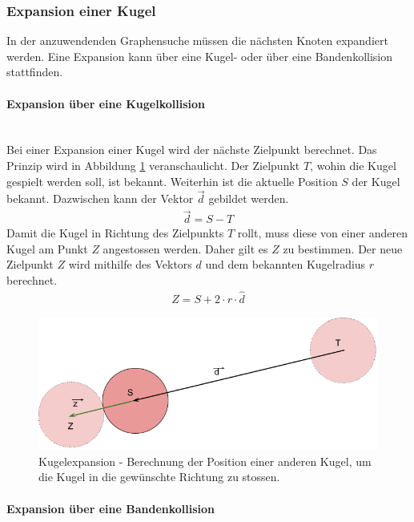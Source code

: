 \subsubsection{Expansion einer Kugel}
In der anzuwendenden Graphensuche müssen die nächsten Knoten expandiert werden.
Eine Expansion kann über eine Kugel- oder über eine Bandenkollision stattfinden.

\paragraph{Expansion über eine Kugelkollision}\mbox{}\\

Bei einer Expansion einer Kugel wird der nächste Zielpunkt berechnet.
Das Prinzip wird in Abbildung \ref{fig:kugelexpansion} veranschaulicht.
Der Zielpunkt $T$, wohin die Kugel gespielt werden soll, ist bekannt.
Weiterhin ist die aktuelle Position $S$ der Kugel bekannt. Dazwischen kann der Vektor $\vec{d}$ gebildet werden.
\begin{align}
    \vec{d} = S - T
\end{align}
Damit die Kugel in Richtung des Zielpunkts $T$ rollt, muss diese von einer anderen Kugel am Punkt $Z$ angestossen werden.
Daher gilt es $Z$ zu bestimmen.
Der neue Zielpunkt $Z$ wird mithilfe des Vektors $d$ und dem bekannten Kugelradius $r$ berechnet.
\begin{align}
    Z = S + 2 \cdot r \cdot \hat{d}
\end{align}

\begin{figure}[h!]
    \begin{center}
        \includegraphics[width=0.5\linewidth]{../common/03_billiard_ai/resources/35_suchkandidat_kugel_expand.png}
    \end{center}
    \caption{Kugelexpansion - Berechnung der Position einer anderen Kugel, um die Kugel in die gewünschte Richtung zu
    stossen.}
    \label{fig:kugelexpansion}
\end{figure}

\paragraph{Expansion über eine Bandenkollision}\label{kandidatensuche:bandenkollisionstheorie}\mbox{}\\


